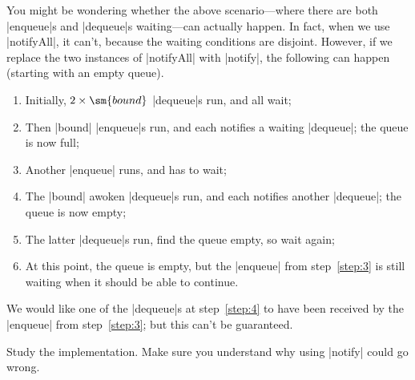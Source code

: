 
You might be wondering whether the above scenario---where there are both
|enqueue|s and |dequeue|s waiting---can actually happen.  In fact, when we use
|notifyAll|, it can't, because the waiting conditions are disjoint.  However,
if we replace the two instances of |notifyAll| with |notify|, the following
can happen (starting with an empty queue).
%
\begin{enumerate}
\item Initially, $2 \times \sm{bound}$ |dequeue|s run, and all wait;

\item Then |bound| |enqueue|s run, and each notifies a waiting |dequeue|; the
  queue is now full;

\item\label{step:3} Another |enqueue| runs, and has to wait;

\item\label{step:4} The |bound| awoken |dequeue|s run, and each notifies
  another |dequeue|; the queue is now empty;

\item The latter |dequeue|s run, find the queue empty, so wait again;

\item At this point, the queue is empty, but the |enqueue| from
  step~\ref{step:3} is still waiting when it should be able to continue.
\end{enumerate}
%
We would like one of the |dequeue|s at step~\ref{step:4} to have been received
by the |enqueue| from step~\ref{step:3}; but this can't be guaranteed.


\begin{instruction}
Study the implementation.  Make sure you understand why using |notify| could
go wrong.
\end{instruction}


